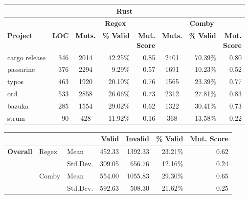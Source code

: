 \documentclass[acmsmall,screen,review,anonymous]{acmart}
\newcommand{\mr}[2]{\multirow{#1}{*}{#2}}
\newcommand{\mc}[3]{\multicolumn{#1}{#2}{#3}}
\begin{document}
{\begin{table}[hbtp]
\begin{varwidth}{.8\linewidth}
\begin{tabularx}{\linewidth}{Xllrrrr}
\end{tabularx}
\begin{tabularx}{\linewidth}{X|r|crr|crr}
\toprule
\mc{8}{c}{\textbf{Rust}} \\ \midrule
                 &              & \multicolumn{3}{c|}{\textbf{Regex}} &\multicolumn{3}{c}{\textbf{Comby}}  \\
\textbf{Project} & \textbf{LOC} & \textbf{Muts.} & \textbf{\% Valid} & \makecell{\textbf{Mut.} \\ \textbf{Score}} & \textbf{Muts.} &  \textbf{\% Valid} & \makecell{\textbf{Mut.} \\ \textbf{Score}}\\\midrule
cargo release    & 346          & 2014   & 42.25\%  & 0.85
& 2401   & 70.39\% & 0.80\\
passarine        & 376          & 2294   & 9.29\%  & 0.57
 & 1691   & 10.23\% & 0.52\\
typos            & 463          & 1920   & 20.10\% & 0.76  & 1565   & 23.39\% & 0.77\\
ord              & 533          & 2858   & 26.66\%  & 0.73
& 2312   & 27.81\% & 0.83\\
bazuka           & 285          & 1554   & 29.02\% & 0.62 & 1322   & 30.41\% & 0.73\\
strum            & 90           & 428     & 11.92\% & 0.16 & 368    & 13.58\% & 0.22\\\bottomrule
\end{tabularx}
\begin{tabularx}{\linewidth}{Xllrrrr}
               & & & \textbf{Valid}  & \textbf{Invalid}  & \textbf{\% Valid} & \textbf{Mut. Score} \\\midrule
 \multirow{4}{*}{\textbf{Overall}} & \mr{2}{Regex} & Mean     &  452.33 &  1392.33 & 23.21\% & 0.62\\
               &   & Std.Dev. & 309.05 & 656.76 & 12.16\%  & 0.24\\\cline{2-7}
 & \mr{2}{Comby} & Mean     & 554.00 &  1055.83 & 29.30\% & 0.65\\
               &   & Std.Dev. & 592.63 & 508.30 & 21.62\%  & 0.25\\\bottomrule
\end{tabularx}
\end{varwidth}
\end{table}


}
\end{document}
